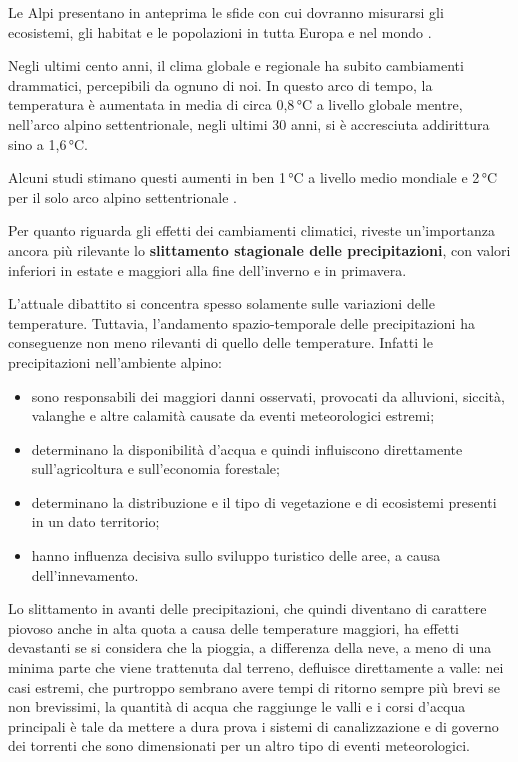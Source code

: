 \documentclass[14pt,a4paper]{article}
\begin{document}
	Le Alpi presentano in anteprima le sfide con cui dovranno misurarsi gli ecosistemi, gli habitat e le popolazioni in tutta Europa e nel mondo \cite{LeAlpi}.
	
	Negli ultimi cento anni, il clima globale e regionale ha subito cambiamenti drammatici, percepibili da ognuno di noi. In questo arco di tempo, la temperatura è aumentata in media di circa 0,8\,°C a livello globale mentre, nell'arco alpino settentrionale, negli ultimi 30 anni, si è accresciuta addirittura sino a 1,6\,°C. 
	
	Alcuni studi stimano questi aumenti in ben 1\,°C a livello medio mondiale e 2\,°C per il solo arco alpino settentrionale \cite{LeAlpi}.
	
	Per quanto riguarda gli effetti dei cambiamenti climatici, riveste un'importanza ancora più rilevante lo \textbf{slittamento stagionale delle precipitazioni}, con valori inferiori in estate e maggiori alla fine dell'inverno e in primavera.
	
	L'attuale dibattito si concentra spesso solamente sulle variazioni delle temperature. Tuttavia, l'andamento spazio-temporale delle precipitazioni ha conseguenze non meno rilevanti di quello delle temperature. Infatti le precipitazioni nell'ambiente alpino:
		
	\begin{itemize}
		\item sono responsabili dei maggiori danni osservati, provocati da alluvioni, siccità, valanghe e altre calamità causate da eventi meteorologici estremi;
		\item determinano la disponibilità d'acqua e quindi influiscono direttamente sull'agricoltura e sull'economia forestale;
		\item determinano la distribuzione e il tipo di vegetazione e di ecosistemi presenti in un dato territorio;
		\item hanno influenza decisiva sullo sviluppo turistico delle aree, a causa dell'innevamento.
	\end{itemize}
	
	Lo slittamento in avanti delle precipitazioni, che quindi diventano di carattere piovoso anche in alta quota a causa delle temperature maggiori, ha effetti devastanti se si considera che la pioggia, a differenza della neve, a meno di una minima parte che viene trattenuta dal terreno, defluisce direttamente a valle: nei casi estremi, che purtroppo sembrano avere tempi di ritorno sempre più brevi se non brevissimi, la quantità di acqua che raggiunge le valli e i corsi d'acqua principali è tale da mettere a dura prova i sistemi di canalizzazione e di governo dei torrenti che sono dimensionati per un altro tipo di eventi meteorologici.
	
\end{document}
